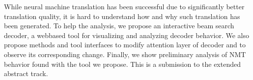 While neural machine translation has been successful due to significantly better translation quality, it is hard to understand how and why such translation has been generated. To help the analysis, we propose an interactive beam search decoder, a webbased tool for visualizing and analyzing decoder behavior. We also propose methods and tool interfaces to modify attention layer of decoder and to observe its corresponding change. Finally, we show preliminary analysis of NMT behavior found with the tool we propose. This is a submission to the extended abstract track.
